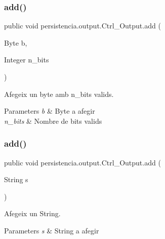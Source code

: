 \subsubsection{\texorpdfstring{add()}{add()}\hspace{0.1cm}{\footnotesize\ttfamily [1/6]}}
{\footnotesize\ttfamily public void persistencia.\+output.\+Ctrl\+\_\+\+Output.\+add (\begin{DoxyParamCaption}\item[{Byte}]{b,  }\item[{Integer}]{n\+\_\+bits }\end{DoxyParamCaption})\hspace{0.3cm}{\ttfamily [inline]}}



Afegeix un byte amb n\+\_\+bits valids. 


\begin{DoxyParams}{Parameters}
{\em b} & Byte a afegir \\
\hline
{\em n\+\_\+bits} & Nombre de bits valids \\
\hline
\end{DoxyParams}
\mbox{\label{classpersistencia_1_1output_1_1Ctrl__Output_a0e3bedb0b88d0e60b228cc49143e6f0e}} 
\subsubsection{\texorpdfstring{add()}{add()}\hspace{0.1cm}{\footnotesize\ttfamily [2/6]}}
{\footnotesize\ttfamily public void persistencia.\+output.\+Ctrl\+\_\+\+Output.\+add (\begin{DoxyParamCaption}\item[{String}]{s }\end{DoxyParamCaption})\hspace{0.3cm}{\ttfamily [inline]}}



Afegeix un String. 


\begin{DoxyParams}{Parameters}
{\em s} & String a afegir \\
\hline
\end{DoxyParams}
\mbox{\label{classpersistencia_1_1output_1_1Ctrl__Output_a4070b40016edf1d959b3f7c60c90ef10}} 
